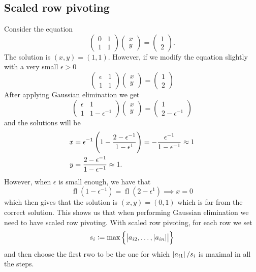 \documentclass[11pt,a4paper]{article}
\DeclareMathOperator{\fl}{fl}
\begin{document}
\subsection{Scaled row pivoting}
Consider the equation
\[
  \begin{pmatrix}
    0 & 1 \\
    1 & 1
  \end{pmatrix}
  \begin{pmatrix}
    x \\ y
  \end{pmatrix} =
  \begin{pmatrix}
    1 \\ 2
  \end{pmatrix}.
\]
The solution is $(x,y) = (1,1)$.
However, if we modify the equation slightly with a very small $\epsilon > 0$
\[
  \begin{pmatrix}
    \epsilon & 1 \\
    1 & 1
  \end{pmatrix}
  \begin{pmatrix}
    x \\ y
  \end{pmatrix} =
  \begin{pmatrix}
    1 \\ 2
  \end{pmatrix}
\]
After applying Gaussian elimination we get
\[
  \begin{pmatrix}
    \epsilon & 1 \\
    1 & 1 - \epsilon^{-1}
  \end{pmatrix}
  \begin{pmatrix}
    x \\ y
  \end{pmatrix} =
  \begin{pmatrix}
    1 \\ 2 - \epsilon^{-1}
  \end{pmatrix}
\]
and the solutions will be
\begin{align*}
  x &= \epsilon^{-1}\del{1 - \frac{2 - \epsilon^{-1}}{1 - \epsilon^{1}}} =
  - \frac{\epsilon^{-1}}{1 - \epsilon^{-1}} \approx 1 \\
  y &= \frac{2 - \epsilon^{-1}}{1 - \epsilon^{-1}} \approx 1.
\end{align*}
However, when $\epsilon$ is small enough, we have that
\[
  \fl(1 - \epsilon^{-1}) = \fl(2 - \epsilon^{1}) \implies x = 0
\]
which then gives that the solution is $(x,y) = (0,1)$ which is far from
the correct solution.
This shows us that when performing Gaussian elimination we need to have
scaled row pivoting.
With scaled row pivoting, for each row we set
\[
  s_i := \max\left\{\left\lvert a_{i2},\dots,\left\lvert a_{in}\right\rvert\right\rvert\right\}
\]
and then choose the first rwo to be the one for which $\left\lvert a_{i1}\right\rvert / s_i$
is maximal in all the steps.
\end{document}
